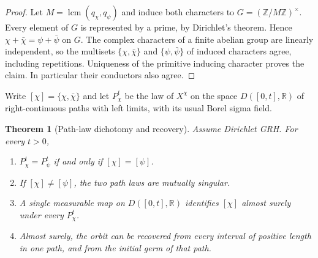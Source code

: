\documentclass[11pt]{article}
\newtheorem{theorem}{Theorem}[section]
\theoremstyle{definition}
\newcommand{\R}{\mathbb R}
\newcommand{\orb}[1]{[#1]}
\begin{document}
\begin{proof}
Let $M=\operatorname{lcm}(q_\chi,q_\psi)$ and induce both characters to
$G=(\mathbb Z/M\mathbb Z)^\times$. Every element of $G$ is represented by a
prime, by Dirichlet's theorem. Hence
$\chi+\bar\chi=\psi+\bar\psi$ on $G$. The complex characters of a finite
abelian group are linearly independent, so the multisets
$\{\chi,\bar\chi\}$ and $\{\psi,\bar\psi\}$ of induced characters agree,
including repetitions. Uniqueness of the primitive inducing character proves
the claim. In particular their conductors also agree.
\end{proof}

Write $\orb\chi=\{\chi,\bar\chi\}$ and let $P_\chi^t$ be the law of $X^\chi$
on the space $D([0,t],\R)$ of right-continuous paths with left limits, with its
usual Borel sigma field.

\begin{theorem}[Path-law dichotomy and recovery]\label{thm:path}
Assume Dirichlet GRH. For every $t>0$,
\begin{enumerate}[label=\textup{(\roman*)}]
\item $P_\chi^t=P_\psi^t$ if and only if $\orb\chi=\orb\psi$.
\item If $\orb\chi\ne\orb\psi$, the two path laws are mutually singular.
\item A single measurable map on $D([0,t],\R)$ identifies $\orb\chi$ almost
surely under every $P_\chi^t$.
\item Almost surely, the orbit can be recovered from every interval of positive
length in one path, and from the initial germ of that path.
\end{enumerate}
\end{theorem}
\end{document}
